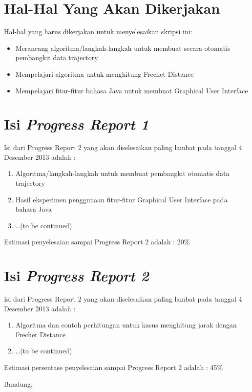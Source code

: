 \documentclass[a4paper,twoside]{article}
\begin{document}
\section{Hal-Hal Yang Akan Dikerjakan}
Hal-hal yang harus dikerjakan untuk menyelesaikan skripsi ini:
\begin{itemize}
	\item Merancang algoritma/langkah-langkah untuk membuat secara otomatis pembangkit data trajectory
	\item Mempelajari algoritma untuk menghitung Frechet Distance
	\item Mempelajari fitur-fitur bahasa Java untuk membuat Graphical User Interface
\end{itemize}

\section{Isi {\it Progress Report 1}}
Isi dari Progress Report 2 yang akan diselesaikan paling lambat pada tanggal 4 Desember 2013 adalah :
\begin{enumerate}
	\item Algoritma/langkah-langkah untuk membuat pembangkit otomatis data trajectory
	\item Hasil eksperimen penggunaan fitur-fitur Graphical User Interface pada bahasa Java
	\item \ldots (to be continued)
\end{enumerate}
Estimasi penyelesaian sampai Progress Report 2 adalah : 20\%

\section{Isi {\it Progress Report 2}}
Isi dari Progress Report 2 yang akan diselesaikan paling lambat pada tanggal 4 Desember 2013 adalah :
\begin{enumerate}
	\item Algoritma dan contoh perhitungan untuk kasus menghitung jarak dengan Frechet Distance
	\item \ldots (to be continued)
\end{enumerate}
Estimasi persentase penyelesaian sampai Progress Report 2 adalah : 45\%
\vspace{1.5cm}

\centering Bandung, \tanggal\\
\vspace{2cm} \nama \\ 
\vspace{1cm}
\end{document}
